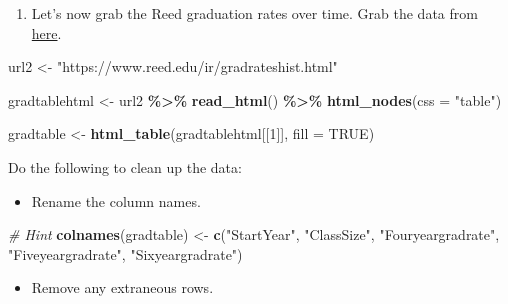 \documentclass[
]{article}
\newenvironment{Shaded}{\begin{snugshade}}{\end{snugshade}}
\newcommand{\AttributeTok}[1]{\textcolor[rgb]{0.13,0.29,0.53}{#1}}
\newcommand{\CommentTok}[1]{\textcolor[rgb]{0.56,0.35,0.01}{\textit{#1}}}
\newcommand{\ConstantTok}[1]{\textcolor[rgb]{0.56,0.35,0.01}{#1}}
\newcommand{\DecValTok}[1]{\textcolor[rgb]{0.00,0.00,0.81}{#1}}
\newcommand{\FunctionTok}[1]{\textcolor[rgb]{0.13,0.29,0.53}{\textbf{#1}}}
\newcommand{\NormalTok}[1]{#1}
\newcommand{\OtherTok}[1]{\textcolor[rgb]{0.56,0.35,0.01}{#1}}
\newcommand{\SpecialCharTok}[1]{\textcolor[rgb]{0.81,0.36,0.00}{\textbf{#1}}}
\newcommand{\StringTok}[1]{\textcolor[rgb]{0.31,0.60,0.02}{#1}}
\providecommand{\tightlist}{%
  \setlength{\itemsep}{0pt}\setlength{\parskip}{0pt}}
\begin{document}
\begin{enumerate}
\def\labelenumi{\alph{enumi}.}
\setcounter{enumi}{4}
\tightlist
\item
  Let's now grab the Reed graduation rates over time. Grab the data from
  \href{https://www.reed.edu/ir/gradrateshist.html}{here}.
\end{enumerate}

\begin{Shaded}
\begin{Highlighting}[]
\NormalTok{url2 }\OtherTok{\textless{}{-}} \StringTok{"https://www.reed.edu/ir/gradrateshist.html"}
  
  
\NormalTok{  gradtablehtml }\OtherTok{\textless{}{-}}\NormalTok{ url2 }\SpecialCharTok{\%\textgreater{}\%}
  \FunctionTok{read\_html}\NormalTok{() }\SpecialCharTok{\%\textgreater{}\%}
  \FunctionTok{html\_nodes}\NormalTok{(}\AttributeTok{css =} \StringTok{"table"}\NormalTok{)}

\NormalTok{gradtable }\OtherTok{\textless{}{-}} \FunctionTok{html\_table}\NormalTok{(gradtablehtml[[}\DecValTok{1}\NormalTok{]], }\AttributeTok{fill =} \ConstantTok{TRUE}\NormalTok{)}
\end{Highlighting}
\end{Shaded}

Do the following to clean up the data:

\begin{itemize}
\tightlist
\item
  Rename the column names.
\end{itemize}

\begin{Shaded}
\begin{Highlighting}[]
\CommentTok{\# Hint}
\FunctionTok{colnames}\NormalTok{(gradtable) }\OtherTok{\textless{}{-}} \FunctionTok{c}\NormalTok{(}\StringTok{"StartYear"}\NormalTok{, }\StringTok{"ClassSize"}\NormalTok{, }\StringTok{"Fouryeargradrate"}\NormalTok{, }\StringTok{"Fiveyeargradrate"}\NormalTok{, }\StringTok{"Sixyeargradrate"}\NormalTok{)}
\end{Highlighting}
\end{Shaded}

\begin{itemize}
\tightlist
\item
  Remove any extraneous rows.
\end{itemize}
\end{document}
